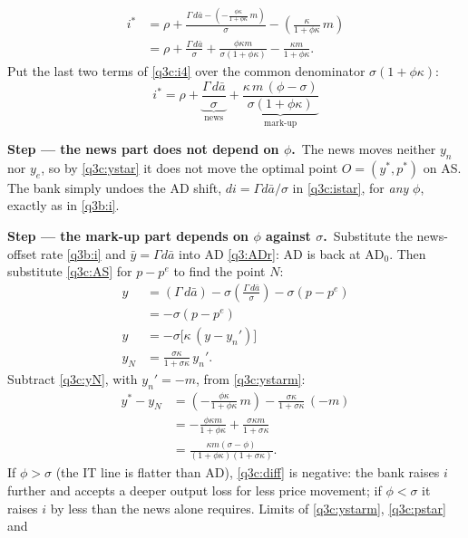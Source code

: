 \documentclass[11pt,a4paper]{article}
\newcommand{\passo}[2]{\par\smallskip\noindent\textbf{Step --- #1.}~#2}
\begin{document}
\begin{sol}
\begin{align}
i^\ast &= \rho+\frac{\Gamma\,d\bar a-\left(-\frac{\phi\kappa}{1+\phi\kappa}\,m\right)}{\sigma}
-\left(\frac{\kappa}{1+\phi\kappa}\,m\right)\nonumber\\
&= \rho+\frac{\Gamma\,d\bar a}{\sigma}+\frac{\phi\kappa m}{\sigma(1+\phi\kappa)}-\frac{\kappa m}{1+\phi\kappa}. \label{q3c:i4}
\end{align}
Put the last two terms of \eqref{q3c:i4} over the common denominator $\sigma(1+\phi\kappa)$:
\begin{equation}
\boxed{i^\ast=\rho+\underbrace{\frac{\Gamma\,d\bar a}{\sigma}}_{\text{news}}
+\underbrace{\frac{\kappa\,m\,(\phi-\sigma)}{\sigma(1+\phi\kappa)}}_{\text{mark-up}}} \label{q3c:istar}
\end{equation}
\passo{the news part does not depend on $\phi$}{The news moves neither $y_n$ nor $y_e$, so by
\eqref{q3c:ystar} it does not move the optimal point $O=(y^\ast,p^\ast)$ on AS. The bank simply
undoes the AD shift, $di=\Gamma d\bar a/\sigma$ in \eqref{q3c:istar}, for \emph{any} $\phi$, exactly
as in \eqref{q3b:i}.}
\passo{the mark-up part depends on $\phi$ against $\sigma$}{Substitute the news-offset rate
\eqref{q3b:i} and $\bar y=\Gamma d\bar a$ into AD \eqref{q3:ADr}: AD is back at AD$_0$. Then
substitute \eqref{q3c:AS} for $p-p^e$ to find the point $N$:}
\begin{align}
y &= (\Gamma\,d\bar a)-\sigma\left(\frac{\Gamma\,d\bar a}{\sigma}\right)-\sigma(p-p^e)\nonumber\\
&= -\sigma(p-p^e)\nonumber\\
y &= -\sigma\big[\kappa\,(y-y_n')\big]\nonumber\\
y_N &= \frac{\sigma\kappa}{1+\sigma\kappa}\,y_n'. \label{q3c:yN}
\end{align}
Subtract \eqref{q3c:yN}, with $y_n'=-m$, from \eqref{q3c:ystarm}:
\begin{align}
y^\ast-y_N &= \left(-\frac{\phi\kappa}{1+\phi\kappa}\,m\right)-\frac{\sigma\kappa}{1+\sigma\kappa}\,(-m)\nonumber\\
&= -\frac{\phi\kappa m}{1+\phi\kappa}+\frac{\sigma\kappa m}{1+\sigma\kappa}\nonumber\\
&= \frac{\kappa m(\sigma-\phi)}{(1+\phi\kappa)(1+\sigma\kappa)}. \label{q3c:diff}
\end{align}
If $\phi>\sigma$ (the IT line is flatter than AD), \eqref{q3c:diff} is negative: the bank raises $i$
further and accepts a deeper output loss for less price movement; if $\phi<\sigma$ it raises $i$ by
less than the news alone requires. Limits of \eqref{q3c:ystarm}, \eqref{q3c:pstar} and

\end{sol}
\end{document}
